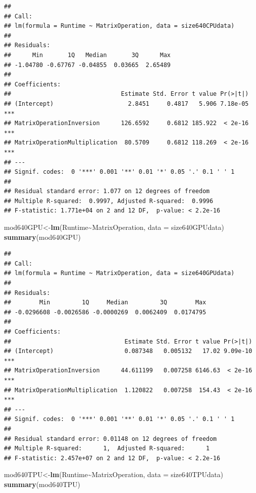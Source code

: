 \documentclass[
]{article}
\newenvironment{Shaded}{\begin{snugshade}}{\end{snugshade}}
\newcommand{\DataTypeTok}[1]{\textcolor[rgb]{0.13,0.29,0.53}{#1}}
\newcommand{\KeywordTok}[1]{\textcolor[rgb]{0.13,0.29,0.53}{\textbf{#1}}}
\newcommand{\NormalTok}[1]{#1}
\newcommand{\OperatorTok}[1]{\textcolor[rgb]{0.81,0.36,0.00}{\textbf{#1}}}
\begin{document}
\begin{verbatim}
## 
## Call:
## lm(formula = Runtime ~ MatrixOperation, data = size640CPUdata)
## 
## Residuals:
##      Min       1Q   Median       3Q      Max 
## -1.04780 -0.67767 -0.04855  0.03665  2.65489 
## 
## Coefficients:
##                               Estimate Std. Error t value Pr(>|t|)    
## (Intercept)                     2.8451     0.4817   5.906 7.18e-05 ***
## MatrixOperationInversion      126.6592     0.6812 185.922  < 2e-16 ***
## MatrixOperationMultiplication  80.5709     0.6812 118.269  < 2e-16 ***
## ---
## Signif. codes:  0 '***' 0.001 '**' 0.01 '*' 0.05 '.' 0.1 ' ' 1
## 
## Residual standard error: 1.077 on 12 degrees of freedom
## Multiple R-squared:  0.9997, Adjusted R-squared:  0.9996 
## F-statistic: 1.771e+04 on 2 and 12 DF,  p-value: < 2.2e-16
\end{verbatim}

\begin{Shaded}
\begin{Highlighting}[]
\NormalTok{mod640GPU\textless{}{-}}\KeywordTok{lm}\NormalTok{(Runtime}\OperatorTok{\textasciitilde{}}\NormalTok{MatrixOperation, }\DataTypeTok{data =}\NormalTok{ size640GPUdata)}
\KeywordTok{summary}\NormalTok{(mod640GPU)}
\end{Highlighting}
\end{Shaded}

\begin{verbatim}
## 
## Call:
## lm(formula = Runtime ~ MatrixOperation, data = size640GPUdata)
## 
## Residuals:
##        Min         1Q     Median         3Q        Max 
## -0.0296608 -0.0026586 -0.0000269  0.0062409  0.0174795 
## 
## Coefficients:
##                                Estimate Std. Error t value Pr(>|t|)    
## (Intercept)                    0.087348   0.005132   17.02 9.09e-10 ***
## MatrixOperationInversion      44.611199   0.007258 6146.63  < 2e-16 ***
## MatrixOperationMultiplication  1.120822   0.007258  154.43  < 2e-16 ***
## ---
## Signif. codes:  0 '***' 0.001 '**' 0.01 '*' 0.05 '.' 0.1 ' ' 1
## 
## Residual standard error: 0.01148 on 12 degrees of freedom
## Multiple R-squared:      1,  Adjusted R-squared:      1 
## F-statistic: 2.457e+07 on 2 and 12 DF,  p-value: < 2.2e-16
\end{verbatim}

\begin{Shaded}
\begin{Highlighting}[]
\NormalTok{mod640TPU\textless{}{-}}\KeywordTok{lm}\NormalTok{(Runtime}\OperatorTok{\textasciitilde{}}\NormalTok{MatrixOperation, }\DataTypeTok{data =}\NormalTok{ size640TPUdata)}
\KeywordTok{summary}\NormalTok{(mod640TPU)}
\end{Highlighting}
\end{Shaded}
\end{document}
